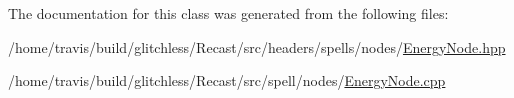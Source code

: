 The documentation for this class was generated from the following files\-:\begin{DoxyCompactItemize}
\item 
/home/travis/build/glitchless/\-Recast/src/headers/spells/nodes/\hyperlink{_energy_node_8hpp}{Energy\-Node.\-hpp}\item 
/home/travis/build/glitchless/\-Recast/src/spell/nodes/\hyperlink{_energy_node_8cpp}{Energy\-Node.\-cpp}\end{DoxyCompactItemize}
